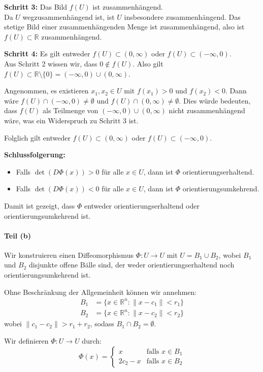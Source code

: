 \documentclass{article}
\newcommand{\R}{\mathbb{R}}
\begin{document}
\textbf{Schritt 3:} Das Bild $f(U)$ ist zusammenhängend.\\
Da $U$ wegzusammenhängend ist, ist $U$ insbesondere zusammenhängend. Das stetige Bild einer zusammenhängenden Menge ist zusammenhängend, also ist $f(U) \subset \R$ zusammenhängend.

\textbf{Schritt 4:} Es gilt entweder $f(U) \subset (0,\infty)$ oder $f(U) \subset (-\infty,0)$.\\
Aus Schritt 2 wissen wir, dass $0 \notin f(U)$. Also gilt $f(U) \subset \R \setminus \{0\} = (-\infty,0) \cup (0,\infty)$. 

Angenommen, es existieren $x_1, x_2 \in U$ mit $f(x_1) > 0$ und $f(x_2) < 0$. Dann wäre $f(U) \cap (-\infty,0) \neq \emptyset$ und $f(U) \cap (0,\infty) \neq \emptyset$. Dies würde bedeuten, dass $f(U)$ als Teilmenge von $(-\infty,0) \cup (0,\infty)$ nicht zusammenhängend wäre, was ein Widerspruch zu Schritt 3 ist.

Folglich gilt entweder $f(U) \subset (0,\infty)$ oder $f(U) \subset (-\infty,0)$.

\textbf{Schlussfolgerung:}
\begin{itemize}
    \item Falls $\det(D\Phi(x)) > 0$ für alle $x \in U$, dann ist $\Phi$ orientierungserhaltend.
    \item Falls $\det(D\Phi(x)) < 0$ für alle $x \in U$, dann ist $\Phi$ orientierungsumkehrend.
\end{itemize}

Damit ist gezeigt, dass $\Phi$ entweder orientierungserhaltend oder orientierungsumkehrend ist.

\paragraph{Teil (b)} Wir konstruieren einen Diffeomorphismus $\Phi: U \to U$ mit $U = B_1 \cup B_2$, wobei $B_1$ und $B_2$ disjunkte offene Bälle sind, der weder orientierungserhaltend noch orientierungsumkehrend ist.

Ohne Beschränkung der Allgemeinheit können wir annehmen:
\begin{align}
B_1 &= \{x \in \R^n : \|x - c_1\| < r_1\}\\
B_2 &= \{x \in \R^n : \|x - c_2\| < r_2\}
\end{align}
wobei $\|c_1 - c_2\| > r_1 + r_2$, sodass $B_1 \cap B_2 = \emptyset$.

Wir definieren $\Phi: U \to U$ durch:
$$\Phi(x) = \begin{cases}
x & \text{falls } x \in B_1\\
2c_2 - x & \text{falls } x \in B_2
\end{cases}$$
\end{document}
